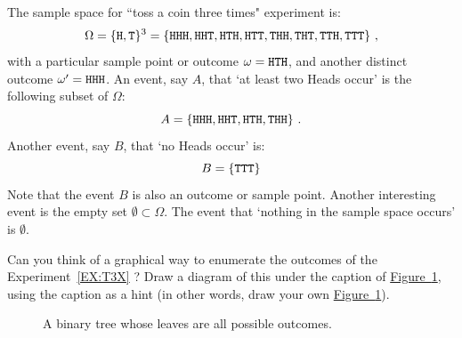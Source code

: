 The sample space for ``toss a coin three times" experiment %
is:
\[
\Omega = \{ {\tt H}, {\tt T} \}^3 =  \{ {\tt HHH}, {\tt HHT}, {\tt HTH}, {\tt HTT}, {\tt THH}, {\tt THT}, {\tt TTH}, {\tt TTT}  \} \ ,
\]
with a particular sample point or outcome $\omega = {\tt HTH}$, and another distinct outcome $\omega' = {\tt HHH}$.  An event, say $A$, that `at least two Heads occur' is the following subset of $\Omega$:
\[
A = \{ {\tt HHH}, {\tt HHT}, {\tt HTH}, {\tt THH} \} \ .
\]
Another event, say $B$, that `no Heads occur' is:
\[
B = \{{\tt TTT}\}
\]
Note that the event $B$ is also an outcome or sample point.  Another interesting event is the empty set $\emptyset  \subset \Omega$.  The event that `nothing in the sample space occurs' is $\emptyset$.

\begin{classwork}
Can you think of a graphical way to enumerate the outcomes of the Experiment~\ref{EX:T3X}%
?  Draw a diagram of this under the caption of \hyperref[F:T3X]{Figure~\ref*{F:T3X}}, using the caption as a hint (in other words, draw your own \hyperref[F:T3X]{Figure~\ref*{F:T3X}}).
\begin{figure}[htpb]
\caption{A binary tree whose leaves are all possible outcomes.\label{F:T3X}}
\vspace{4cm}
\end{figure}
\end{classwork}

